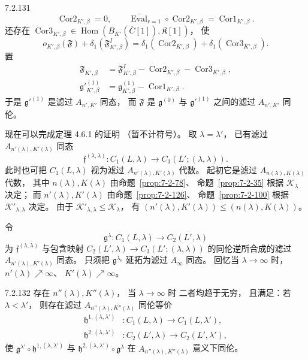 \begin{remark}{7.2.131}
\[\operatorname{Cor2}_{K',\beta}=0,
\qquad
\overline{\operatorname{Eval}}_{r=1}\circ
\operatorname{Cor2}_{K',\beta}
=\operatorname{Cor1}_{K',\beta}.
\]
还存在
$\operatorname{Cor3}_{K',\beta}
\in\operatorname{Hom}
(B_{K'}(\overline C[1]),\mathfrak K[1])$，
使
\[
o_{K',\beta}(\mathfrak F)
+\delta_1(\mathfrak F^I_{K',\beta})
=\delta_1(\operatorname{Cor2}_{K',\beta})
+\delta_1(\operatorname{Cor3}_{K',\beta}).
\]
置
\[
\begin{aligned}
\mathfrak F_{K',\beta}
&=\mathfrak F^I_{K',\beta}
-\operatorname{Cor2}_{K',\beta}
-\operatorname{Cor3}_{K',\beta},\\
\mathfrak g'^{(1)}_{K',\beta}
&=\mathfrak g^{(1)}_{K',\beta}
-\operatorname{Cor1}_{K',\beta}.
\end{aligned}
\]
于是 $\mathfrak g'^{(1)}$
是滤过 $A_{n',K'}$ 同态，
而 $\mathfrak F$ 是
$\mathfrak g^{(0)}$ 与 $\mathfrak g'^{(1)}$
之间的滤过 $A_{n',K'}$ 同伦。
\end{remark}

现在可以完成定理 4.6.1 的证明
（暂不计符号）。
取 $\lambda=\lambda'$，
已有滤过 $A_{n'(\lambda),K'(\lambda)}$ 同态
\[
\mathfrak f^{(\lambda,\lambda)}
\colon C_1(L,\lambda)
\longrightarrow C_3(L';(\lambda,\lambda)).
\]
此时也可把 $C_1(L,\lambda)$
视为滤过 $A_{n'(\lambda),K'(\lambda)}$ 代数。
起初它是滤过 $A_{n(\lambda),K(\lambda)}$ 代数，
其中 $n(\lambda),K(\lambda)$
由命题~\ref{prop:7-2-78}、
命题~\ref{prop:7-2-35}
根据 $\mathcal K_\lambda$ 决定；
而 $n'(\lambda),K'(\lambda)$
由命题~\ref{prop:7-2-126}、
命题~\ref{prop:7-2-100}
根据 $\mathcal K'_{\lambda,\lambda}$ 决定。
由于 $\mathcal K'_{\lambda,\lambda}
\le\mathcal K_\lambda$，
有
$(n'(\lambda),K'(\lambda))
\le(n(\lambda),K(\lambda))$。

令
\[
\mathfrak g^\lambda\colon
C_1(L,\lambda)\longrightarrow C_2(L',\lambda)
\]
为 $\mathfrak f^{(\lambda,\lambda)}$
与包含映射
$C_2(L',\lambda)\to C_3(L';(\lambda,\lambda))$
的同伦逆所合成的滤过
$A_{n'(\lambda),K'(\lambda)}$ 同态。
只须把 $\mathfrak g^{\lambda_0}$
延拓为滤过 $A_\infty$ 同态。
回忆当 $\lambda\to\infty$ 时，
$n'(\lambda)\nearrow\infty$、
$K'(\lambda)\nearrow\infty$。

\begin{proposition}{7.2.132}\label{prop:7-2-132}
存在 $n''(\lambda),K''(\lambda)$，
当 $\lambda\to\infty$ 时
二者均趋于无穷，
且满足：若 $\lambda<\lambda'$，
则存在滤过 $A_{n''(\lambda),K''(\lambda)}$
同伦等价
\[
\begin{aligned}
\mathfrak h^{1,(\lambda,\lambda')}
&\colon C_1(L,\lambda)\to C_1(L,\lambda'),\\
\mathfrak h^{2,(\lambda,\lambda')}
&\colon C_2(L',\lambda)\to C_2(L',\lambda'),
\end{aligned}
\]
使
$\mathfrak g^{\lambda'}\circ
\mathfrak h^{1,(\lambda,\lambda')}$
与
$\mathfrak h^{2,(\lambda,\lambda')}\circ
\mathfrak g^\lambda$
在 $A_{n''(\lambda),K''(\lambda)}$
意义下同伦。
\end{proposition}

